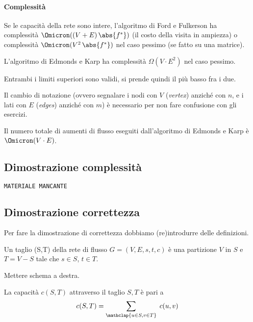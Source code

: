 \paragraph{Complessità}
Se le capacità della rete sono intere, l'algoritmo di Ford e Fulkerson ha complessità \(\Omicron((V+E)\, \abs{f^{*}} )\) (il costo della visita in ampiezza) o complessità \(\Omicron(V^2\, \abs{f^{*}}) \) nel caso pessimo (se fatto su una matrice).

L'algoritmo di Edmonds e Karp ha complessità \(\Omega(V \cdot E^{2})\) nel caso pessimo.

Entrambi i limiti superiori sono validi, si prende quindi il più basso fra i due.

\begin{note}
Il cambio di notazione (ovvero segnalare i nodi con \(V\) (\emph{vertex}) anziché con \(n\), e i lati con \(E\) (\emph{edges}) anziché con \(m\)) è necessario per non fare confusione con gli esercizi.
\end{note}

\begin{lemma}
Il numero totale di aumenti di flusso eseguiti dall'algoritmo di Edmonds e Karp è \(\Omicron(V \cdot E) \).
\end{lemma}

\subsection{Dimostrazione complessità}

\texttt{MATERIALE MANCANTE}
%
%

\subsection{Dimostrazione correttezza}

Per fare la dimostrazione di correttezza dobbiamo (re)introdurre delle definizioni.

\begin{definition}[Taglio]
Un \alert{taglio} (S,T) della rete di flusso \(G = (V,E,s,t,c)\) è una partizione \(V\) in \(S\) e \(T = V-S\) tale che \(s \in S\), \(t \in T\).
\end{definition}

Mettere schema a destra.

\begin{definition}
La \alert{capacità} \(c(S,T)\) attraverso il taglio \(S,T\) è pari a
\begin{equation*}
c(S,T) = \sum_{\mathclap{u \in S, v \in T}}\; c(u,v)
\end{equation*}
\end{definition}


